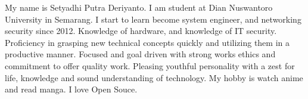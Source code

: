 My name is Setyadhi Putra Deriyanto. I am student at Dian Nuswantoro University in Semarang. I start to learn become system engineer, and networking security since 2012. Knowledge of hardware, and knowledge of IT security. Proficiency in grasping new technical concepts quickly and utilizing them in a productive manner. Focused and goal driven with strong works ethics and commitment to offer quality work. Pleasing youthful personality with a zest for life, knowledge and sound understanding of technology. My hobby is watch anime and read manga. I love Open Souce.




\divider\smallskip





{\faGraduationCap} 

\divider

{\faGraduationCap} 